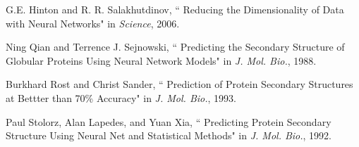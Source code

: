 \documentclass[]{article}
\begin{document}
\begin{thebibliography}{9}

G.E. Hinton and R. R. Salakhutdinov,
   `` Reducing the Dimensionality of Data with Neural Networks"
   in \emph{Science}, 2006.

Ning Qian and Terrence J. Sejnowski,
  `` Predicting the Secondary Structure of Globular Proteins Using Neural Network Models"
  in \emph{J. Mol. Bio.}, 1988.

Burkhard Rost and Christ Sander,
  `` Prediction of Protein Secondary Structures at Bettter than 70\% Accuracy"
  in \emph{J. Mol. Bio.}, 1993.

Paul Stolorz, Alan Lapedes, and Yuan Xia,
   `` Predicting Protein Secondary Structure Using Neural Net and Statistical Methods"
   in \emph{J. Mol. Bio.}, 1992.

\end{thebibliography}
\end{document}
